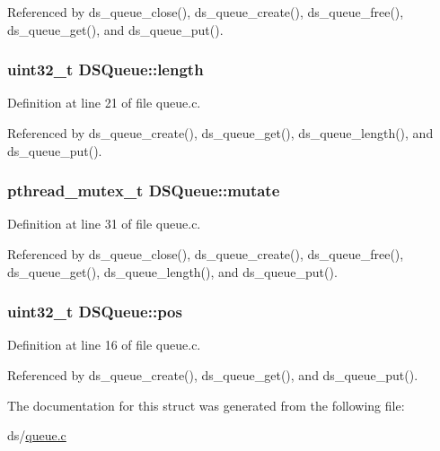 Referenced by ds\+\_\+queue\+\_\+close(), ds\+\_\+queue\+\_\+create(), ds\+\_\+queue\+\_\+free(), ds\+\_\+queue\+\_\+get(), and ds\+\_\+queue\+\_\+put().

\subsubsection[{\texorpdfstring{length}{length}}]{\setlength{\rightskip}{0pt plus 5cm}uint32\+\_\+t D\+S\+Queue\+::length}\hypertarget{structDSQueue_abe11e160f25a9a87b7b7f78111c8c9f4}{}\label{structDSQueue_abe11e160f25a9a87b7b7f78111c8c9f4}


Definition at line 21 of file queue.\+c.



Referenced by ds\+\_\+queue\+\_\+create(), ds\+\_\+queue\+\_\+get(), ds\+\_\+queue\+\_\+length(), and ds\+\_\+queue\+\_\+put().

\subsubsection[{\texorpdfstring{mutate}{mutate}}]{\setlength{\rightskip}{0pt plus 5cm}pthread\+\_\+mutex\+\_\+t D\+S\+Queue\+::mutate}\hypertarget{structDSQueue_a3bdfb7e6aee291283183270e564e7a01}{}\label{structDSQueue_a3bdfb7e6aee291283183270e564e7a01}


Definition at line 31 of file queue.\+c.



Referenced by ds\+\_\+queue\+\_\+close(), ds\+\_\+queue\+\_\+create(), ds\+\_\+queue\+\_\+free(), ds\+\_\+queue\+\_\+get(), ds\+\_\+queue\+\_\+length(), and ds\+\_\+queue\+\_\+put().

\subsubsection[{\texorpdfstring{pos}{pos}}]{\setlength{\rightskip}{0pt plus 5cm}uint32\+\_\+t D\+S\+Queue\+::pos}\hypertarget{structDSQueue_a77b07c69cbf472b979f491f5757e4a58}{}\label{structDSQueue_a77b07c69cbf472b979f491f5757e4a58}


Definition at line 16 of file queue.\+c.



Referenced by ds\+\_\+queue\+\_\+create(), ds\+\_\+queue\+\_\+get(), and ds\+\_\+queue\+\_\+put().



The documentation for this struct was generated from the following file\+:\begin{DoxyCompactItemize}
\item 
ds/\hyperlink{queue_8c}{queue.\+c}\end{DoxyCompactItemize}

